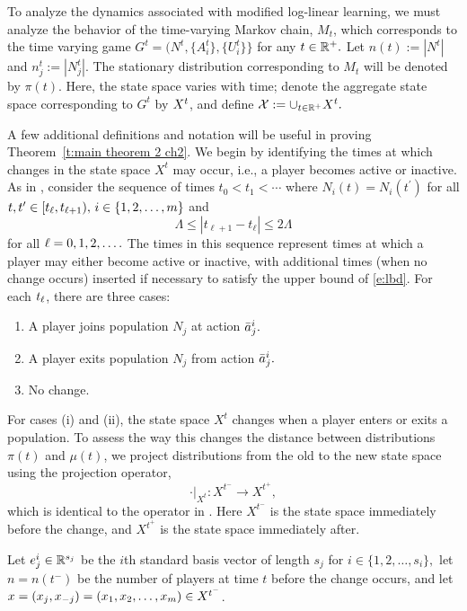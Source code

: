 To analyze the dynamics associated with modified log-linear learning, we must analyze the behavior of the time-varying Markov chain, $M_t$, which corresponds to the time varying game $G^t = (N^t,\{A_i^t\},\{U_i^t\}\}$ for any $t\in \mathbb{R}^+.$ Let $n(t):= |N^t|$ and $n_j^t := |N_j^t|.$ The stationary distribution corresponding to $M_t$ will be denoted by $\pi(t).$ Here, the state space varies with time; denote the aggregate state space corresponding to $G^t$ by $X^t$, and define ${\mathcal X}:=\cup_{t\in \mathbb{R}^+} X^t.$ 

A few additional definitions and notation will be useful in proving Theorem~\ref{t:main theorem 2 ch2}. 
We begin by identifying the times at which changes in the state space $X^t$ may occur, i.e., a player becomes active or inactive. As in \cite{Shah2010}, consider the sequence of times
 $t_0<t_1<\cdots$
 where $N_i(t) = N_i(t^\prime)$ for all $t,t^\prime\in [t_{\ell},t_{{\ell}+1}),\, i\in \{1,2,\ldots,m\}$ and 
 \begin{equation}\label{e:lbd}
\Lambda \leq |t_{\ell+1} - t_{\ell}|\leq 2\Lambda
\end{equation}
for all ${\ell} = 0,1,2,\ldots.$ The times in this sequence represent times at which a player may either become active or inactive, with additional times (when no change occurs) inserted if necessary to satisfy the upper bound of \eqref{e:lbd}. For each $t_{\ell}$, there are three cases:
\begin{enumerate}[label=(\roman*)]
\item A player joins population $N_j$ at action $\bar{a}_j^i.$
\item A player exits population $N_j$ from action $\bar{a}_j^i.$
\item No change.
\end{enumerate}
For cases (i) and (ii), the state space $X^t$ changes when a player enters or exits a population. To assess the way this changes the distance between distributions $\pi(t)$ and $\mu(t)$, we project distributions from the old to the new state space using the projection operator, $$\cdot|_{X^t}:X^{t^-}\to X^{t^+},$$ which is identical to the operator in \cite{Shah2010}.  Here $X^{t^-}$ is the state space immediately before the change, and $X^{t^+}$ is the state space immediately after. 


Let $e_j^i\in\mathbb{R}^{s_j}$ be the $i$th standard basis vector of length $s_j$ for $i\in \{1,2,\ldots,s_i\},$   let $n = n(t^-)$ be the number of players at time $t$ before the change occurs, and let $x = (x_{j},x_{{-j}}) = (x_{1},x_{2},\ldots,x_{m})\in X^{t^-} $.

